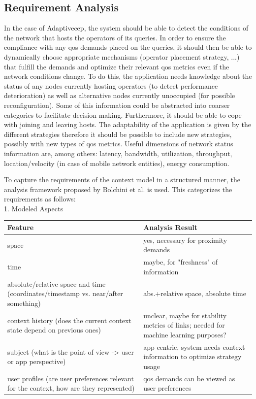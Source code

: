 \subsection{Requirement Analysis}
In the case of Adaptive\gls{cep}, the system should be able to detect the conditions of the network that hosts the operators of its queries. In order to ensure the compliance with any \gls{qos} demands placed on the queries, it should then be able to dynamically choose appropriate mechanisms (operator placement strategy, ...) that fulfill the demands and optimize their relevant \gls{qos} metrics even if the network conditions change. 
To do this, the application needs knowledge about the status of any nodes currently hosting operators (to detect performance deterioration) as well as alternative nodes currently unoccupied (for possible reconfiguration).
Some of this information could be abstracted into coarser categories to facilitate decision making.
Furthermore, it should be able to cope with joining and leaving hosts. 
The adaptability of the application is given by the different strategies therefore it should be possible to include new strategies, possibly with new types of \gls{qos} metrics. Useful dimensions of network status information are, among others: latency, bandwidth, utilization, throughput, location/velocity (in case of mobile network entities), energy consumption.

To capture the requirements of the context model in a structured manner, the analysis framework proposed by Bolchini et al. is used. This categorizes the requirements as follows: \\
1. Modeled Aspects \\
\newline
\begin{tabularx}{\textwidth}{|X|X|}
\hline
\textbf{Feature} & \textbf{Analysis Result} \\
\hline 
space & yes, necessary for proximity demands \\ 
\hline 
time & maybe, for "freshness" of information \\ 
\hline 
absolute/relative space and time (coordinates/timestamp vs. near/after something)  & abs.+relative space, absolute time \\ 
\hline 
context history (does the current context state depend on previous ones)  & unclear, maybe for stability metrics of links; needed for machine learning purposes? \\ 
\hline 
subject (what is the point of view -> user or app perspective) & app centric, system needs context information to optimize strategy usage \\ 
\hline 
user profiles (are user preferences relevant for the context, how are they represented) & \gls{qos} demands can be viewed as user preferences \\ 
\hline 
\end{tabularx} 


